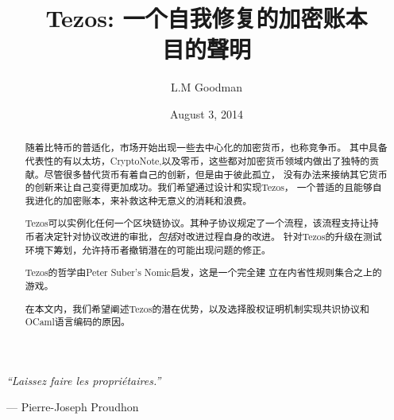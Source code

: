 \documentclass[letterpaper]{article}
\author{L.M Goodman}
\date{August 3, 2014}
\title{Tezos: 一个自我修复的加密账本 \\ 目的聲明}
\begin{document}
\maketitle



\epigraph{\emph{``Laissez faire les propri\'{e}taires.''}}
{--- \textup{Pierre-Joseph Proudhon}}

\begin{abstract}
随着比特币的普适化，市场开始出现一些去中心化的加密货币，也称竞争币。
其中具备代表性的有以太坊，CryptoNote,以及零币，这些都对加密货币领域内做出了独特的贡献。尽管很多替代货币有着自己的创新，但是由于彼此孤立，
没有办法来接纳其它货币的创新来让自己变得更加成功。我们希望通过设计和实现Tezos，
一个普适的且能够自我进化的加密账本，来补救这种无意义的消耗和浪费。

Tezos可以实例化任何一个区块链协议。其种子协议规定了一个流程，该流程支持让持币者决定针对协议改进的审批，\emph{包括}对改进过程自身的改进。
针对Tezos的升级在测试环境下筹划，允许持币者撤销潜在的可能出现问题的修正。

Tezos的哲学由Peter Suber’s Nomic\cite{Nomic}启发，这是一个完全建
立在内省性规则集合之上的游戏。

在本文内，我们希望阐述Tezos的潜在优势，以及选择股权证明机制实现共识协议和
OCaml语言编码的原因。


\end{abstract}
\newpage
\tableofcontents
\end{document}
